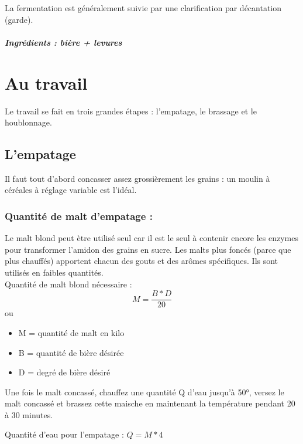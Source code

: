 \documentclass{report}
\begin{document}
    

La fermentation est généralement suivie par une clarification par décantation (garde).

\paragraph{Ingrédients : bière + levures}






\chapter{Au travail}

Le travail se fait en trois grandes étapes : l'empatage, le brassage et le houblonnage.

\section{L'empatage}
Il faut tout d'abord concasser assez grossièrement les grains : un moulin à céréales à réglage variable est l'idéal.

\subsection*{Quantité de malt d'empatage :}

Le malt blond peut ètre utilisé seul car il est le seul à contenir encore les enzymes pour transformer l'amidon des grains en sucre. Les malts plus foncés (parce que plus chauffés) apportent chacun des gouts et des arômes spécifiques. Ils sont utilisés en faibles quantités.\\

Quantité de malt blond nécessaire : 
\begin{equation}
M=\frac{B*D}{20}
\end{equation}
ou
\begin{itemize}
\item M = quantité de malt en kilo
\item B = quantité de bière désirée
\item  D = degré de bière désiré
\end{itemize}


Une fois le malt concassé, chauffez une quantité Q d'eau jusqu'à 50°, versez le malt concassé et brassez cette maische en maintenant la température pendant 20 à 30 minutes. 

Quantité d'eau pour l'empatage : $Q = M * 4$
\end{document}
